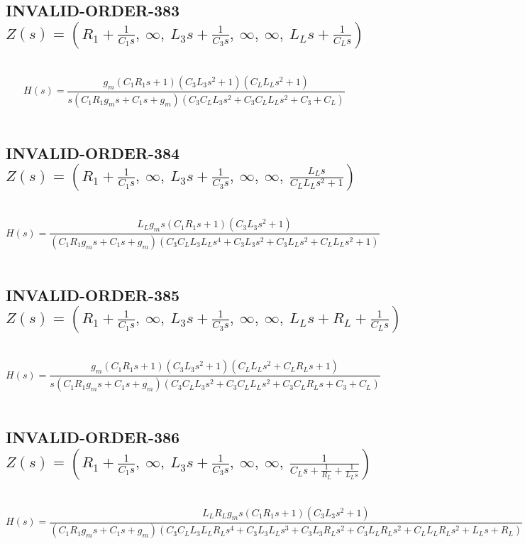 \documentclass{article}
\begin{document}
\subsection{INVALID-ORDER-383 $Z(s) = \left( R_{1} + \frac{1}{C_{1} s}, \  \infty, \  L_{3} s + \frac{1}{C_{3} s}, \  \infty, \  \infty, \  L_{L} s + \frac{1}{C_{L} s}\right)$ } \ 
\textbf{\[H(s) = \frac{g_{m} \left(C_{1} R_{1} s + 1\right) \left(C_{3} L_{3} s^{2} + 1\right) \left(C_{L} L_{L} s^{2} + 1\right)}{s \left(C_{1} R_{1} g_{m} s + C_{1} s + g_{m}\right) \left(C_{3} C_{L} L_{3} s^{2} + C_{3} C_{L} L_{L} s^{2} + C_{3} + C_{L}\right)}\] } \ 
\subsection{INVALID-ORDER-384 $Z(s) = \left( R_{1} + \frac{1}{C_{1} s}, \  \infty, \  L_{3} s + \frac{1}{C_{3} s}, \  \infty, \  \infty, \  \frac{L_{L} s}{C_{L} L_{L} s^{2} + 1}\right)$ } \ 
\textbf{\[H(s) = \frac{L_{L} g_{m} s \left(C_{1} R_{1} s + 1\right) \left(C_{3} L_{3} s^{2} + 1\right)}{\left(C_{1} R_{1} g_{m} s + C_{1} s + g_{m}\right) \left(C_{3} C_{L} L_{3} L_{L} s^{4} + C_{3} L_{3} s^{2} + C_{3} L_{L} s^{2} + C_{L} L_{L} s^{2} + 1\right)}\] } \ 
\subsection{INVALID-ORDER-385 $Z(s) = \left( R_{1} + \frac{1}{C_{1} s}, \  \infty, \  L_{3} s + \frac{1}{C_{3} s}, \  \infty, \  \infty, \  L_{L} s + R_{L} + \frac{1}{C_{L} s}\right)$ } \ 
\textbf{\[H(s) = \frac{g_{m} \left(C_{1} R_{1} s + 1\right) \left(C_{3} L_{3} s^{2} + 1\right) \left(C_{L} L_{L} s^{2} + C_{L} R_{L} s + 1\right)}{s \left(C_{1} R_{1} g_{m} s + C_{1} s + g_{m}\right) \left(C_{3} C_{L} L_{3} s^{2} + C_{3} C_{L} L_{L} s^{2} + C_{3} C_{L} R_{L} s + C_{3} + C_{L}\right)}\] } \ 
\subsection{INVALID-ORDER-386 $Z(s) = \left( R_{1} + \frac{1}{C_{1} s}, \  \infty, \  L_{3} s + \frac{1}{C_{3} s}, \  \infty, \  \infty, \  \frac{1}{C_{L} s + \frac{1}{R_{L}} + \frac{1}{L_{L} s}}\right)$ } \ 
\textbf{\[H(s) = \frac{L_{L} R_{L} g_{m} s \left(C_{1} R_{1} s + 1\right) \left(C_{3} L_{3} s^{2} + 1\right)}{\left(C_{1} R_{1} g_{m} s + C_{1} s + g_{m}\right) \left(C_{3} C_{L} L_{3} L_{L} R_{L} s^{4} + C_{3} L_{3} L_{L} s^{3} + C_{3} L_{3} R_{L} s^{2} + C_{3} L_{L} R_{L} s^{2} + C_{L} L_{L} R_{L} s^{2} + L_{L} s + R_{L}\right)}\] } \ 
\end{document}
